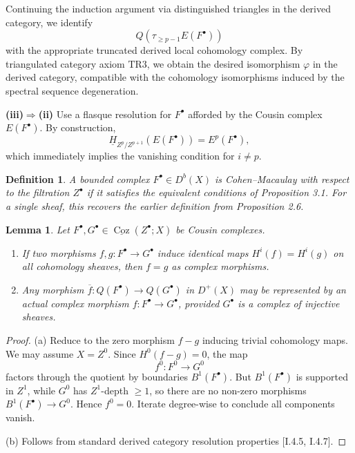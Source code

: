 \documentclass[12pt]{book}
\theoremstyle{plain}
\newtheorem{lemma}{Lemma}[section]
\newtheorem{definition}{Definition}[section]
\begin{document}
\setcounter{page}{246}
Continuing the induction argument via distinguished triangles in the derived category, we identify
\[
Q(\tau_{\ge p-1}E(F^\bullet))
\]
with the appropriate truncated derived local cohomology complex. By triangulated category axiom \(\text{TR3}\), we obtain the desired isomorphism \(\varphi\) in the derived category, compatible with the cohomology isomorphisms induced by the spectral sequence degeneration.

\medskip
\textbf{(iii)\(\Rightarrow\)(ii)}
Use a flasque resolution for \(F^\bullet\) afforded by the Cousin complex \(E(F^\bullet)\). By construction,
\[
\underline{H}_{Z^p/Z^{p+1}}(E(F^\bullet)) = E^p(F^\bullet),
\]
which immediately implies the vanishing condition for \(i\ne p\).

\setcounter{page}{247}
\begin{definition}
A bounded complex \(F^\bullet\in D^b(X)\) is \textit{Cohen--Macaulay with respect to the filtration \(Z^\bullet\)} if it satisfies the equivalent conditions of Proposition 3.1. For a single sheaf, this recovers the earlier definition from Proposition 2.6.
\end{definition}

\begin{lemma}
Let \(F^\bullet,G^\bullet\in\underline{\operatorname{Coz}}(Z^\bullet;X)\) be Cousin complexes.
\begin{enumerate}
\item[\textup{(a)}] If two morphisms \(f,g\colon F^\bullet\to G^\bullet\) induce identical maps \(H^i(f)=H^i(g)\) on all cohomology sheaves, then \(f=g\) as complex morphisms.
\item[\textup{(b)}] Any morphism \(\overline{f}\colon Q(F^\bullet)\to Q(G^\bullet)\) in \(D^+(X)\) may be represented by an actual complex morphism \(f\colon F^\bullet\to G^\bullet\), provided \(G^\bullet\) is a complex of injective sheaves.
\end{enumerate}
\end{lemma}

\begin{proof}
\textup{(a)} Reduce to the zero morphism \(f-g\) inducing trivial cohomology maps. We may assume \(X=Z^0\). Since \(H^0(f-g)=0\), the map
\[
f^0\colon F^0\to G^0
\]
factors through the quotient by boundaries \(B^1(F^\bullet)\). But \(B^1(F^\bullet)\) is supported in \(Z^1\), while \(G^0\) has \(Z^1\)-depth \(\ge 1\), so there are no non-zero morphisms \(B^1(F^\bullet)\to G^0\). Hence \(f^0=0\). Iterate degree-wise to conclude all components vanish.

\textup{(b)} Follows from standard derived category resolution properties [I.4.5, I.4.7].
\end{proof}
\end{document}
